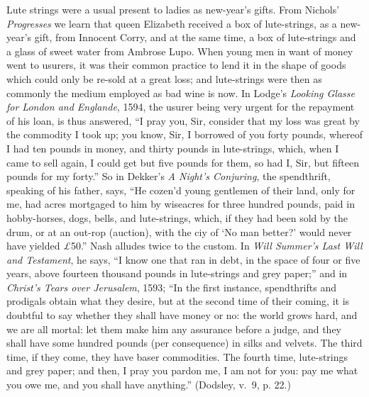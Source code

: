 Lute strings
were a usual present to ladies as new-year’s gifts. From
Nichols’ \textit{Progresses} we learn that queen Elizabeth received a box of lute-strings,
as a new-year’s gift, from Innocent Corry, and at the same time, a box of lute-strings
and a glass of sweet water from Ambrose Lupo. When young men
in want of money went to usurers, it was their common practice to lend it
in the shape of goods which could only be re-sold at a great loss; and lute-strings
were then as commonly the medium employed as bad wine is now. In Lodge’s
\textit{Looking Glasse for London and Englande}, 1594, the usurer being very urgent
for the repayment of his loan, is thus answered, “I pray you, Sir, consider that
my loss was great by the commodity I took up; you know, Sir, I borrowed of you
forty pounds, whereof I had ten pounds in money, and thirty pounds in lute-strings, 
which, when I came to sell again, I could get but five pounds for them, so
had I, Sir, but fifteen pounds for my forty.” So in Dekker’s \textit{A Night’s Conjuring}, 
the spendthrift, speaking of his father, says, “He cozen’d young gentlemen
of their land, only for me, had acres mortgaged to him by wiseacres for three
hundred pounds, paid in hobby-horses, dogs, bells, and lute-strings, which, if they
had been sold by the drum, or at an out-rop (auction), with the ciy of ‘No man
better?’ would never have yielded \textit{£}50.” Nash alludes twice to the custom. In
\textit{Will Summer’s Last Will and Testament}, he says, “I know one that ran in debt,
in the space of four or five years, above fourteen thousand pounds in lute-strings
and grey paper;” and in \textit{Christ’s Tears over Jerusalem}, 1593; “In the first instance, 
spendthrifts and prodigals obtain what they desire, but at the second time
of their coming, it is doubtful to say whether they shall have money or no: the world
grows hard, and we are all mortal: let them make him any assurance before a
judge, and they shall have some hundred pounds (per consequence) in silks and
velvets. The third time, if they come, they have baser commodities. The fourth
time, lute-strings and grey paper; and then, I pray you pardon me, I am not for
you: pay me what you owe me, and you shall have anything.” (Dodsley, v.~9,
p. 22.)

